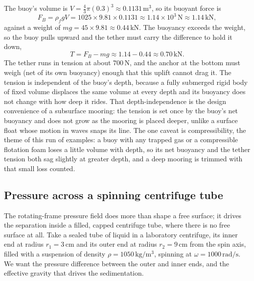 The buoy's volume is $V = \tfrac{4}{3}\pi (0.3)^3 \approx 0.1131\,\text{m}
^3$, so its buoyant force is
\[
F_B = \rho_f g V
= 1025 \times 9.81 \times 0.1131
\approx 1.14 \times 10^3\,\text{N}
\approx 1.14\,\text{kN},
\]
against a weight of $m g = 45 \times 9.81 \approx 0.44\,\text{kN}$. The
buoyancy exceeds the weight, so the buoy pulls upward and the tether must
carry the difference to hold it down,
\[
T = F_B - m g \approx 1.14 - 0.44 \approx 0.70\,\text{kN}.
\]
The tether runs in tension at about $700\,\text{N}$, and the anchor at the
bottom must weigh (net of its own buoyancy) enough that this uplift cannot
drag it. The tension is independent of the buoy's depth, because a fully
submerged rigid body of fixed volume displaces the same volume at every
depth and its buoyancy does not change with how deep it rides. That
depth-independence is the design convenience of a subsurface mooring: the
tension is set once by the buoy's net buoyancy and does not grow as the
mooring is placed deeper, unlike a surface float whose motion in waves
snaps its line. The one caveat is compressibility, the theme of this run of
examples: a buoy with any trapped gas or a compressible flotation foam
loses a little volume with depth, so its net buoyancy and the tether
tension both sag slightly at greater depth, and a deep mooring is trimmed
with that small loss counted.

\subsection{Pressure across a spinning centrifuge tube}

The rotating-frame pressure field does more than shape a free surface; it
drives the separation inside a filled, capped centrifuge tube, where there
is no free surface at all. Take a sealed tube of liquid in a laboratory
centrifuge, its inner end at radius $r_1 = 3\,\si{\centi\meter}$ and its
outer end at radius $r_2 = 9\,\si{\centi\meter}$ from the spin axis, filled
with a suspension of density $\rho = 1050\,\si{\kilogram\per\meter\cubed}$,
spinning at $\omega = 1000\,\text{rad/s}$. We want the pressure difference
between the outer and inner ends, and the effective gravity that drives the
sedimentation.

